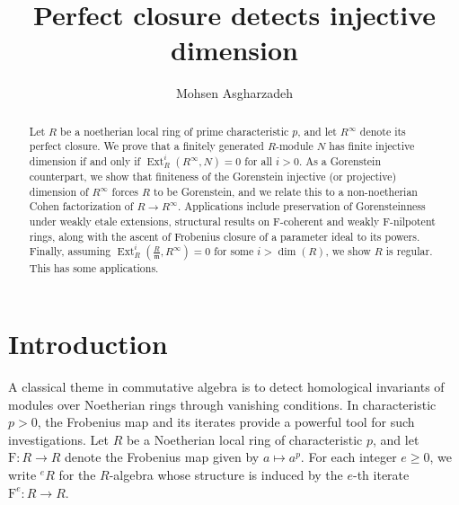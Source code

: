 \documentclass[11pt,a4paper]{amsart}
\numberwithin{equation}{section}
\theoremstyle{definition}
\theoremstyle{remark}
\begin{document}
	
	\author[M. Asgharzadeh ]{Mohsen Asgharzadeh }
	\date{}
	\title[Perfect closure detects injective dimension ]{Perfect closure detects injective dimension  }
	
	\address{M. Asgharzadeh}
	
 
	
	\begin{abstract}
Let $R$ be a noetherian local ring of prime characteristic $p$, and let $R^\infty$ denote its perfect closure. We prove that a finitely generated \(R\)-module $N$ has finite injective dimension if and only if $\operatorname{Ext}_R^i(R^\infty, N) = 0$ for all $i > 0$. As a Gorenstein counterpart, we show that finiteness of the Gorenstein injective (or projective) dimension of $R^\infty$ forces $R$ to be Gorenstein, and we relate this to a non-noetherian Cohen factorization of $R \to R^\infty$. Applications include preservation of Gorensteinness under weakly  etale extensions, structural results on F-coherent and weakly F-nilpotent rings, along with the ascent of Frobenius closure of a parameter ideal  to its powers. Finally,  assuming
$\operatorname{Ext}^{i}_{R}(\frac{R}{\mathfrak m},R^{\infty})=0$
for some $i>\dim(R)$, we show $R$ is regular. This  has some applications.
	\end{abstract}

\maketitle
\tableofcontents
	

\section{Introduction}

A classical theme in commutative algebra is to detect homological invariants of modules over Noetherian rings through vanishing conditions. In characteristic \(p > 0\), the Frobenius map and its iterates provide a powerful tool for such investigations. Let \(R\) be a Noetherian local ring of characteristic \(p\), and let \(\mathrm{F} : R \to R\) denote the Frobenius map given by \(a \mapsto a^p\). For each integer \(e \ge 0\), we write \({}^e R\) for the \(R\)-algebra whose structure is induced by the \(e\)-th iterate \(\mathrm{F}^e : R \to R\).
\end{document}
